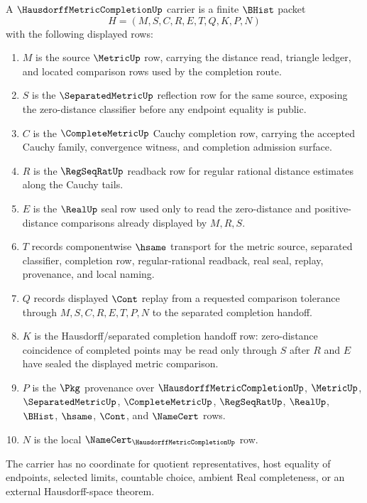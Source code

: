 \begin{definition}
\label{def:hausdorff-metric-completion-carrier}
A $\HausdorffMetricCompletionUp$ carrier is a finite $\BHist$ packet
$$
H=(M,S,C,R,E,T,Q,K,P,N)
$$
with the following displayed rows:
\begin{enumerate}
\item $M$ is the source $\MetricUp$ row, carrying the distance read, triangle ledger, and located comparison rows used by the completion route.
\item $S$ is the $\SeparatedMetricUp$ reflection row for the same source, exposing the zero-distance classifier before any endpoint equality is public.
\item $C$ is the $\CompleteMetricUp$ Cauchy completion row, carrying the accepted Cauchy family, convergence witness, and completion admission surface.
\item $R$ is the $\RegSeqRatUp$ readback row for regular rational distance estimates along the Cauchy tails.
\item $E$ is the $\RealUp$ seal row used only to read the zero-distance and positive-distance comparisons already displayed by $M,R,S$.
\item $T$ records componentwise $\hsame$ transport for the metric source, separated classifier, completion row, regular-rational readback, real seal, replay, provenance, and local naming.
\item $Q$ records displayed $\Cont$ replay from a requested comparison tolerance through $M,S,C,R,E,T,P,N$ to the separated completion handoff.
\item $K$ is the Hausdorff/separated completion handoff row: zero-distance coincidence of completed points may be read only through $S$ after $R$ and $E$ have sealed the displayed metric comparison.
\item $P$ is the $\Pkg$ provenance over $\HausdorffMetricCompletionUp$, $\MetricUp$, $\SeparatedMetricUp$, $\CompleteMetricUp$, $\RegSeqRatUp$, $\RealUp$, $\BHist$, $\hsame$, $\Cont$, and $\NameCert$ rows.
\item $N$ is the local $\NameCert_{\HausdorffMetricCompletionUp}$ row.
\end{enumerate}
The carrier has no coordinate for quotient representatives, host equality of endpoints, selected limits, countable choice, ambient Real completeness, or an external Hausdorff-space theorem.
\end{definition}

